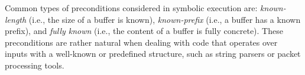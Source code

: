 



Common types of preconditions considered in symbolic execution are: {\em known-length} (i.e., the size of a buffer is known), {\em known-prefix} (i.e., a buffer has a known prefix), and {\em fully known} (i.e., the content of a buffer is fully concrete). These preconditions are rather natural when dealing with code that operates over inputs with a well-known or predefined structure, such as string parsers or packet processing tools. 

